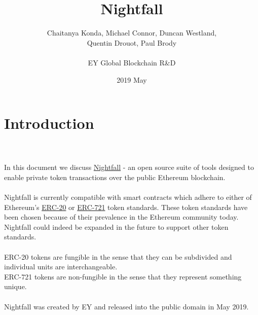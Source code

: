 \documentclass{article}
\title{Nightfall \footnotetext{Document prepared by Michael Connor}}
\date{2019 May}
\author{Chaitanya Konda, Michael Connor, Duncan Westland,\\
Quentin Drouot, Paul Brody\\
\\
EY Global Blockchain R\&D\\
}
\begin{document}
\maketitle %
\dosecttoc %
\dosectlof
\doparttoc %
\tableofcontents %



\newpage

\part{Introduction}
\label{part:introduction}
\parttoc

\ \\
\\
\noindent
In this document we discuss \href{https://github.com/EYBlockchain/nightfall}{Nightfall} - an open source suite of tools designed to enable private token transactions over the public Ethereum blockchain.\\
\\
Nightfall is currently compatible with smart contracts which adhere to either of Ethereum's \href{https://github.com/ethereum/EIPs/blob/master/EIPS/eip-20.md}{ERC-20} or \href{https://github.com/ethereum/EIPs/blob/master/EIPS/eip-721.md}{ERC-721} token standards. These token standards have been chosen because of their prevalence in the Ethereum community today. Nightfall could indeed be expanded in the future to support other token standards.\\
\\
ERC-20 tokens are fungible in the sense that they can be subdivided and individual units are interchangeable.\\
ERC-721 tokens are non-fungible in the sense that they represent something unique.\\
\\
Nightfall was created by EY and released into the public domain in May 2019.
\end{document}
